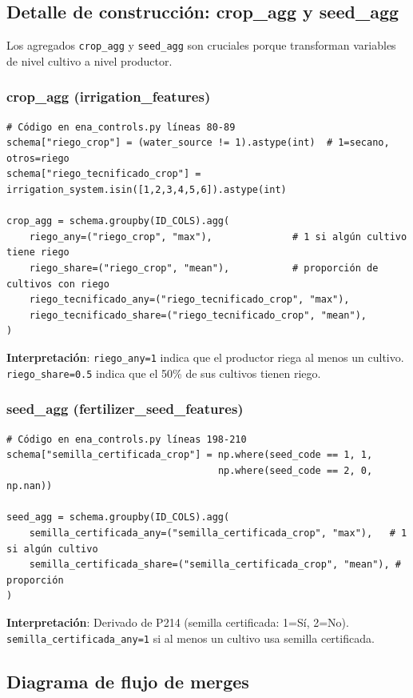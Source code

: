 \documentclass[11pt,a4paper]{article}
\begin{document}
\subsection{Detalle de construcción: crop\_agg y seed\_agg}

Los agregados \texttt{crop\_agg} y \texttt{seed\_agg} son cruciales porque transforman variables de nivel cultivo a nivel productor.

\subsubsection{crop\_agg (irrigation\_features)}
\begin{verbatim}
# Código en ena_controls.py líneas 80-89
schema["riego_crop"] = (water_source != 1).astype(int)  # 1=secano, otros=riego
schema["riego_tecnificado_crop"] = irrigation_system.isin([1,2,3,4,5,6]).astype(int)

crop_agg = schema.groupby(ID_COLS).agg(
    riego_any=("riego_crop", "max"),              # 1 si algún cultivo tiene riego
    riego_share=("riego_crop", "mean"),           # proporción de cultivos con riego
    riego_tecnificado_any=("riego_tecnificado_crop", "max"),
    riego_tecnificado_share=("riego_tecnificado_crop", "mean"),
)
\end{verbatim}

\textbf{Interpretación}: \texttt{riego\_any=1} indica que el productor riega al menos un cultivo. \texttt{riego\_share=0.5} indica que el 50\% de sus cultivos tienen riego.

\subsubsection{seed\_agg (fertilizer\_seed\_features)}
\begin{verbatim}
# Código en ena_controls.py líneas 198-210
schema["semilla_certificada_crop"] = np.where(seed_code == 1, 1, 
                                     np.where(seed_code == 2, 0, np.nan))

seed_agg = schema.groupby(ID_COLS).agg(
    semilla_certificada_any=("semilla_certificada_crop", "max"),   # 1 si algún cultivo
    semilla_certificada_share=("semilla_certificada_crop", "mean"), # proporción
)
\end{verbatim}

\textbf{Interpretación}: Derivado de P214 (semilla certificada: 1=Sí, 2=No). \texttt{semilla\_certificada\_any=1} si al menos un cultivo usa semilla certificada.

\subsection{Diagrama de flujo de merges}
\end{document}
